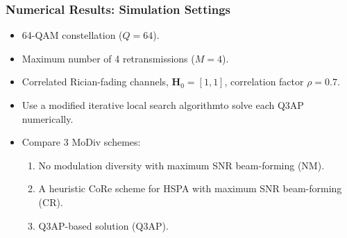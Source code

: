 \documentclass{beamer}
\begin{document}
\begin{frame}
  \frametitle{Numerical Results: Simulation Settings}
  \begin{itemize}[<+->]
    \item 64-QAM constellation ($Q = 64$).
    \item Maximum number of 4 retransmissions ($M = 4$).
    \item Correlated Rician-fading channels, $\mathbf{H}_0 = [1, 1]$,
    correlation factor $\rho = 0.7$.
    \item Use a modified iterative local search algorithm\footnotemark to
    solve each Q3AP numerically.
    \item Compare 3 MoDiv schemes:
      \begin{enumerate}
        \item No modulation diversity with maximum SNR beam-forming (NM).
        \item A heuristic CoRe scheme for HSPA with maximum SNR
        beam-forming (CR).
        \item Q3AP-based solution (Q3AP).
      \end{enumerate}
  \end{itemize}
\end{frame}
\end{document}
